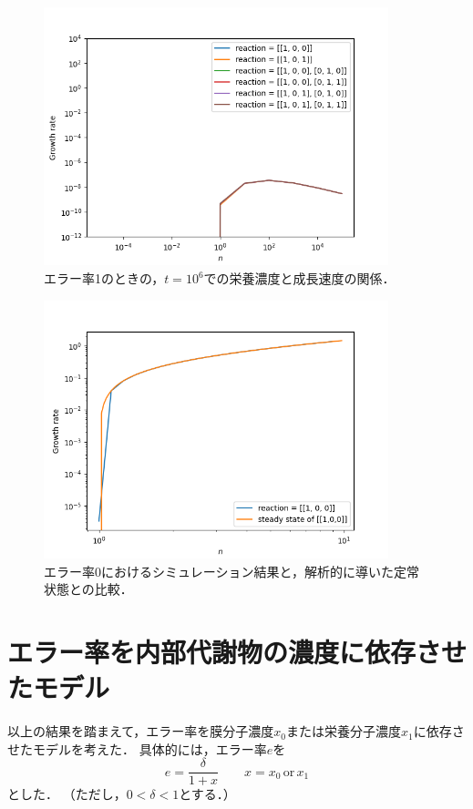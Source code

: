 \documentclass[a4paper,11pt]{jsarticle}
\begin{document}
\begin{figure}[htbp]
  \centering
  \includegraphics[width=10cm]{waste_err1_ng_reac_check_T6.png}
  \caption{エラー率1のときの，$t=10^6$での栄養濃度と成長速度の関係．}
  \label{fig:err1_ng_reac_check_T6}
\end{figure}

\begin{figure}[htbp]
  \centering
  \includegraphics[width=10cm]{waste_err0_ng_reac1_2_s.png}
  \caption{エラー率0におけるシミュレーション結果と，解析的に導いた定常状態との比較．}
  \label{fig:err0_ng_reac_1_2_s}
\end{figure}

\newpage

\section{エラー率を内部代謝物の濃度に依存させたモデル}

以上の結果を踏まえて，エラー率を膜分子濃度$x_0$または栄養分子濃度$x_1$に依存させたモデルを考えた．
具体的には，エラー率$e$を
\begin{equation}
  e = \frac{\delta}{1+x} \qquad x = x_0 \,\mathrm{or}\, x_1 
\end{equation}
とした．
（ただし，$0<\delta<1$とする．）
\end{document}
